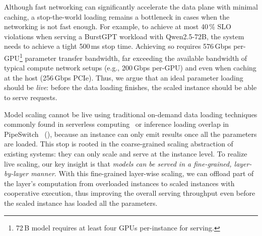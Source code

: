Although fast networking can significantly accelerate the data plane
with minimal caching,
a stop-the-world loading remains a bottleneck in cases
when the networking is not fast enough.
For example,
to achieve at most 40\,\% SLO violations when serving a BurstGPT workload with Qwen2.5-72B,
the system needs to achieve a tight 500\,ms stop time.
Achieving so requires 576\,Gbps per-GPU\footnote{\footnotesize{72\,B model requires at least four GPUs per-instance for serving.}}
parameter transfer bandwidth,
far exceeding
the available bandwidth of typical compute network setups (e.g., 200\,Gbps per-GPU)
and even when caching at the host (256\,Gbps PCIe).
Thus, we argue that an ideal parameter loading should be \emph{live}:
before the data loading finishes, the scaled instance should be able to serve requests.

Model scaling cannot be live using traditional
on-demand data loading techniques commonly found in serverless computing~\cite{mitosis,DBLP:conf/eurosys/WangHW19,DBLP:conf/sosp/HuangZMLLCJLSZL24}
or inference loading overlap in PipeSwitch~\cite{pipeswitch} (\textsection{\ref{sec:overview}}),
because an instance can only emit results once all the parameters are loaded.
This stop is rooted in the coarse-grained scaling abstraction of existing systems:
they can only scale and serve at the instance level.
To realize live scaling,
our key insight is that
\emph{models can be served in a fine-grained, layer-by-layer manner}.
With this fine-grained layer-wise scaling,
we can offload part of the layer's computation from overloaded instances to scaled instances
with cooperative execution,
thus improving the overall serving throughput
even before the scaled instance has loaded all the parameters.

